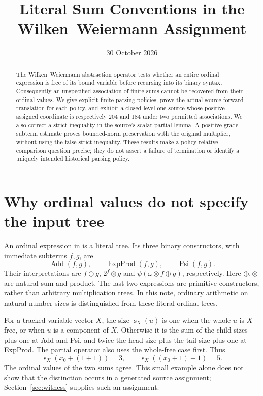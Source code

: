 \documentclass[11pt]{article}
\title{Literal Sum Conventions in the Wilken--Weiermann Assignment}
\author{}
\date{30 October 2026}
\newcommand{\sz}{\operatorname{s}}
\newcommand{\Add}{\operatorname{Add}}
\newcommand{\EP}{\operatorname{ExpProd}}
\newcommand{\CP}{\operatorname{Psi}}
\begin{document}
\maketitle
\begin{abstract}
The Wilken--Weiermann abstraction operator tests whether an entire ordinal
expression is free of its bound variable before recursing into its binary
syntax. Consequently an unspecified association of finite sums cannot be
recovered from their ordinal values. We give explicit finite parsing policies,
prove the actual-source forward translation for each policy, and exhibit a
closed level-one source whose positive assigned coordinate is respectively
204 and 184 under two permitted associations. We also correct a strict
inequality in the source's scalar-partial lemma. A positive-grade subterm
estimate proves bounded-norm preservation with the original multiplier,
without using the false strict inequality. These results make a
policy-relative comparison question precise; they do not assert a failure of
termination or identify a uniquely intended historical parsing policy.
\end{abstract}

\section{Why ordinal values do not specify the input tree}

An ordinal expression in \cite[Definition~2.1]{WW} is a literal tree. Its
three binary constructors, with immediate subterms $f,g$, are
\[
 \Add(f,g),\qquad \EP(f,g),\qquad \CP(f,g).
\]
Their interpretations are $f\oplus g$, $2^f\otimes g$ and
$\psi(\omega\otimes f\oplus g)$, respectively. Here $\oplus,\otimes$
are natural sum and product. The last two expressions are primitive
constructors, rather than arbitrary multiplication trees. In this note,
ordinary arithmetic on natural-number sizes is distinguished from these
literal ordinal trees.

For a tracked variable vector $X$, the size $\sz_X(u)$ is one when the
whole $u$ is $X$-free, or when $u$ is a component of $X$. Otherwise it is
the sum of the child sizes plus one at Add and Psi, and twice the head
size plus the tail size plus one at ExpProd. The partial operator also
uses the whole-free case first. Thus
\[
 \sz_X(x_0+(1+1))=3,\qquad
 \sz_X((x_0+1)+1)=5.
\]
The ordinal values of the two sums agree. This small example alone does
not show that the distinction occurs in a generated source assignment;
Section~\ref{sec:witness} supplies such an assignment.
\end{document}
